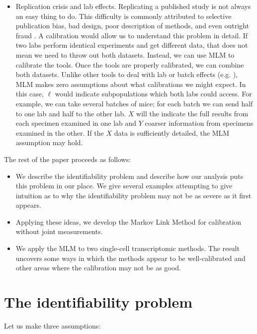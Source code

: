 \begin{itemize}
    \item Replication crisis and lab effects.  Replicating a published study is not always an easy thing to do.  This difficulty is commonly attributed to selective publication bias, bad design, poor description of methods, and even outright fraud \cite{baker2016reproducibility}.  A calibration would allow us to understand this problem in detail.  If two labs perform identical experiments and get different data, that does not mean we need to throw out both datasets.  Instead, we can use MLM to calibrate the tools.  Once the tools are properly calibrated, we can combine both datasets.  Unlike other tools to deal with lab or batch effects (e.g. \cite{crow2018characterizing,johnson2007adjusting}), MLM makes zero assumptions about what calibrations we might expect.  In this case, $\ell$ would indicate subpopulations which both labs could access.  For example, we can take several batches of mice; for each batch we can send half to one lab and half to the other lab.  $X$ will the indicate the full results from each specimen examined in one lab and $Y$ coarser information from specimens examined in the other.  If the $X$ data is sufficiently detailed, the MLM assumption may hold.  
\end{itemize}

The rest of the paper proceeds as follows:

\begin{itemize}
\item We describe the identifiability problem and describe how our analysis puts this problem in our place.  We give several examples attempting to give intuition as to why the identifiability problem may not be as severe as it first appears.
\item Applying these ideas, we develop the Markov Link Method for calibration without joint measurements.
\item We apply the MLM to two single-cell transcriptomic methods.  The result uncovers some ways in which the methods appear to be well-calibrated and other areas where the calibration may not be as good. 
\end{itemize}

\section{The identifiability problem}

Let us make three assumptions:

